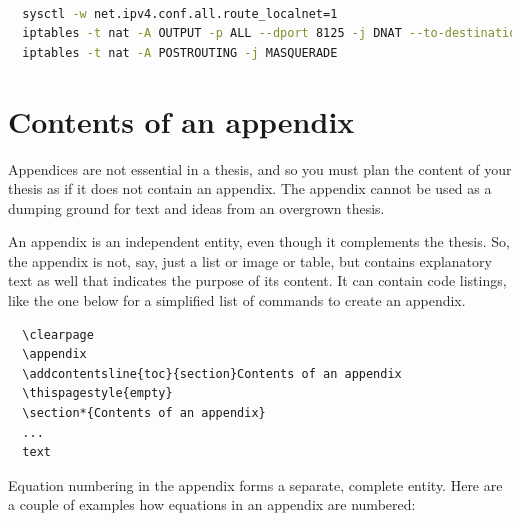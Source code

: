 \documentclass[english, 12pt, a4paper, sci, utf8, a-2b, online]{aaltothesis}
\begin{document}
\begin{lstlisting}[language=bash, caption={Script for mapping localhost to br0 interface}]

  sysctl -w net.ipv4.conf.all.route_localnet=1
  iptables -t nat -A OUTPUT -p ALL --dport 8125 -j DNAT --to-destination 192.168.1.202:8125
  iptables -t nat -A POSTROUTING -j MASQUERADE

\end{lstlisting}

\clearpage

\section{Contents of an appendix}
\label{app:contents}

Appendices are not essential in a thesis, and so you must plan the content of
your thesis as if it does not contain an appendix. The appendix cannot be used
as a dumping ground for text and ideas from an overgrown thesis.

An appendix is an independent entity, even though it complements the thesis.
So, the appendix is not, say, just a list or image or table, but contains
explanatory text as well that indicates the purpose of its content. It can
contain code listings, like the one below for a simplified list of commands to
create an appendix.
\begin{verbatim}
  \clearpage
  \appendix
  \addcontentsline{toc}{section}Contents of an appendix
  \thispagestyle{empty}
  \section*{Contents of an appendix}
  ...
  text
\end{verbatim}

Equation numbering in the appendix forms a separate, complete entity. Here are a couple of examples how equations in an appendix are numbered:

\end{document}
